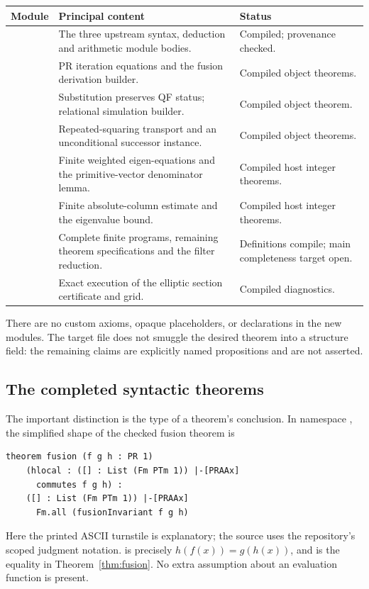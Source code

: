\begin{longtable}{P{.29\linewidth}P{.40\linewidth}P{.21\linewidth}}
\toprule
Module & Principal content & Status\\
\midrule\endhead
{} & The three upstream syntax, deduction and
arithmetic module bodies. & Compiled; provenance checked.\\[3pt]
 & PR iteration equations and the fusion
derivation builder. & Compiled object theorems.\\[3pt]
 & Substitution preserves QF status;
relational simulation builder. & Compiled object theorem.\\[3pt]
 & Repeated-squaring transport and an
unconditional successor instance. & Compiled object theorems.\\[3pt]
 & Finite weighted eigen-equations
and the primitive-vector denominator lemma. & Compiled host integer
theorems.\\[3pt]
 & Finite absolute-column estimate and
the eigenvalue bound. & Compiled host integer theorems.\\[3pt]
 & Complete finite programs,
remaining theorem specifications and the filter reduction. & Definitions
compile; main completeness target open.\\[3pt]
 & Exact execution of the elliptic
section certificate and grid. & Compiled diagnostics.\\
\bottomrule
\end{longtable}

There are no custom axioms, opaque placeholders,  or
 declarations in the new modules. The target file does
not smuggle the desired theorem into a structure field: the remaining
claims are explicitly named propositions and are not asserted.

\subsection{The completed syntactic theorems}

The important distinction is the type of a theorem's conclusion. In
namespace , the simplified
shape of the checked fusion theorem is
\begin{verbatim}
theorem fusion (f g h : PR 1)
    (hlocal : ([] : List (Fm PTm 1)) |-[PRAAx]
      commutes f g h) :
    ([] : List (Fm PTm 1)) |-[PRAAx]
      Fm.all (fusionInvariant f g h)
\end{verbatim}
Here the printed ASCII turnstile is explanatory; the source uses the
repository's scoped judgment notation.  is precisely
$h(f(x))=g(h(x))$, and  is the equality in
Theorem~\ref{thm:fusion}. No extra assumption about an evaluation
function is present.

